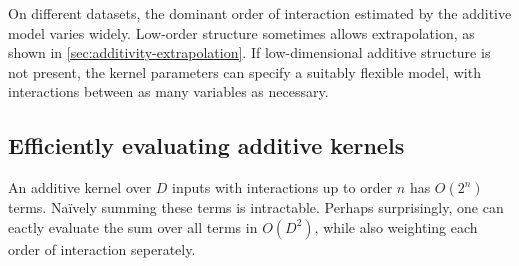 On different datasets, the dominant order of interaction estimated by the additive model varies widely.
%
%
Low-order structure sometimes allows extrapolation, as shown in \cref{sec:additivity-extrapolation}.
If low-dimensional additive structure is not present, the kernel parameters can specify a suitably flexible model, with interactions between as many variables as necessary.





\subsection{Efficiently evaluating additive kernels}
An additive kernel over $D$ inputs with interactions up to order $n$ has $O(2^n)$ terms.
Na\"{i}vely summing these terms is intractable.
Perhaps surprisingly, one can eactly evaluate the sum over all terms in $O(D^2)$, while also weighting each order of interaction seperately.

